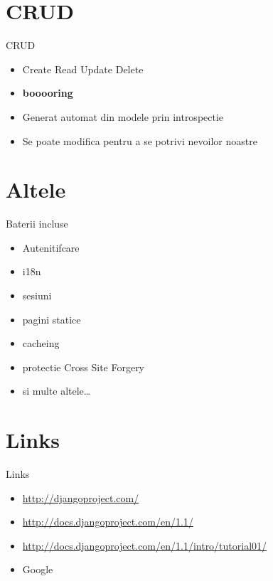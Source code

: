 \documentclass{beamer}
\begin{document}
%  

%  

%  

\section{CRUD}
\begin{frame}{CRUD}
  \begin{itemize}
    \item Create Read Update Delete
    \pause
    \item \textbf{booooring}
    \pause
    \item Generat automat din modele prin introspectie 
    \pause
    \item Se poate modifica pentru a se potrivi nevoilor noastre
  \end{itemize}
\end{frame}

\section{Altele}
\begin{frame}{Baterii incluse}
  \begin{itemize}
    \item Autenitifcare
    \item i18n
    \item sesiuni
    \item pagini statice
    \item cacheing
    \item protectie Cross Site Forgery
    \item si multe altele\ldots 
  \end{itemize}
\end{frame}

\section{Links}
\begin{frame}{Links}
  \begin{itemize}
    \item \url{http://djangoproject.com/}
    \item \url{http://docs.djangoproject.com/en/1.1/}
    \item \url{http://docs.djangoproject.com/en/1.1/intro/tutorial01/}
    \item Google
  \end{itemize}
\end{frame}
\end{document}
